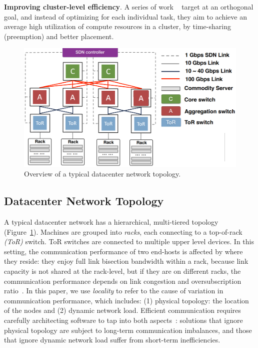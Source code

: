 \noindent\textbf{Improving cluster-level efficiency}. A series of work ~\cite{222611,Shen2018NexusA} target at an orthogonal goal, and instead of optimizing for each individual task, they aim to achieve an average high utilization of compute resources in a cluster, by time-sharing (preemption) and better placement.

\begin{figure}[t!]
	\centering
	\includegraphics[width=.6\linewidth, trim=2 3 3 3,clip]{Figures/dc.png}
	\caption{Overview of a typical datacenter network topology.}
	\label{fig:dc}
\end{figure}

\subsection{Datacenter Network Topology}
\label{sec:datacenternetwork}
A typical datacenter network has a hierarchical, multi-tiered topology~\cite{Mysore2009PortLandAS,VL2,Roy2015InsideTS,incbricks} (Figure~\ref{fig:dc}). Machines are grouped into \textit{racks}, each connecting to a top-of-rack \textit{(ToR)} switch. ToR switches are connected to multiple upper level devices. In this setting, the communication performance of two end-hosts is affected by where they reside: they enjoy full link bisection bandwidth within a rack, because link capacity is not shared at the rack-level, but if they are on different racks, the communication performance depends on link congestion and oversubscription ratio~\cite{Bilal2012ACS}. In this paper, we use \textit{locality} to refer to the cause of variation in communication performance, which includes: (1) physical topology: the location of the nodes and (2) dynamic network load. Efficient communication requires carefully architecting software to tap into both aspects~\cite{eyeQ, 27Octobe15:online}: solutions that ignore physical topology are subject to long-term communication imbalances, and those that ignore dynamic network load suffer from short-term inefficiencies.